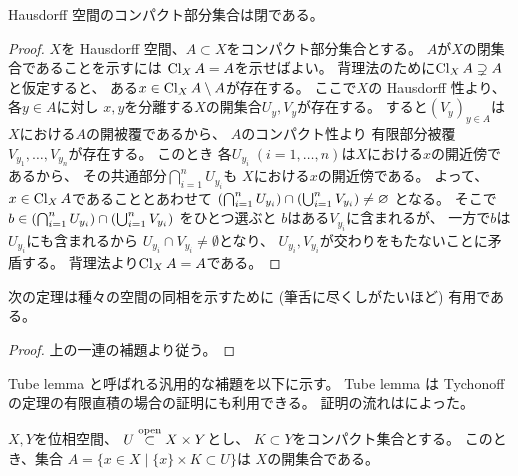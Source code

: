 \documentclass[report]{jlreq}
\begin{document}
\begin{lemma}
    Hausdorff 空間のコンパクト部分集合は閉である。
\end{lemma}

\begin{proof}
    $X$を Hausdorff 空間、$A \subset X$をコンパクト部分集合とする。
    $A$が$X$の閉集合であることを示すには
    $\operatorname{Cl}_X A = A$を示せばよい。
    背理法のために$\operatorname{Cl}_X A \supsetneq A$と仮定すると、
    ある$x \in \operatorname{Cl}_X A \setminus A$が存在する。
    ここで$X$の Hausdorff 性より、
    各$y \in A$に対し
    $x, y$を分離する$X$の開集合$U_y, V_y$が存在する。
    すると$(V_y)_{y \in A}$は$X$における$A$の開被覆であるから、
    $A$のコンパクト性より
    有限部分被覆$V_{y_1}, \dots, V_{y_n}$が存在する。
    このとき
    各$U_{y_i} \; (i = 1, \dots, n)$は$X$における$x$の開近傍であるから、
    その共通部分$\bigcap_{i = 1}^n U_{y_i}$も
    $X$における$x$の開近傍である。
    よって、$x \in \operatorname{Cl}_X A$であることとあわせて
    $\left({ \bigcap_{i = 1}^n U_{y_i} }\right)
        \cap \left({\bigcup_{i = 1}^n V_{y_i}}\right)
        \neq \varnothing$
    となる。
    そこで$b \in \left({ \bigcap_{i = 1}^n U_{y_i} }\right)
        \cap \left({\bigcup_{i = 1}^n V_{y_i}}\right)$
    をひとつ選ぶと
    $b$はある$V_{y_i}$に含まれるが、
    一方で$b$は$U_{y_i}$にも含まれるから
    $U_{y_i} \cap V_{y_i} \neq \emptyset$となり、
    $U_{y_i}, V_{y_i}$が交わりをもたないことに矛盾する。
    背理法より$\operatorname{Cl}_X A = A$である。
\end{proof}

次の定理は種々の空間の同相を示すために (筆舌に尽くしがたいほど) 有用である。


\begin{proof}
    上の一連の補題より従う。
\end{proof}

Tube lemma と呼ばれる汎用的な補題を以下に示す。
Tube lemma は Tychonoff の定理の有限直積の場合の証明にも利用できる。
証明の流れは\cite[p.189]{Rot98}によった。

\begin{lemma}
    $X, Y$を位相空間、
    $U \stackrel{\text{open}}{\subset} X \times Y$とし、
    $K \subset Y$をコンパクト集合とする。
    このとき、集合
    $A = \{ x \in X \mid \{ x \} \times K \subset U \}$は
    $X$の開集合である。
\end{lemma}
\end{document}
